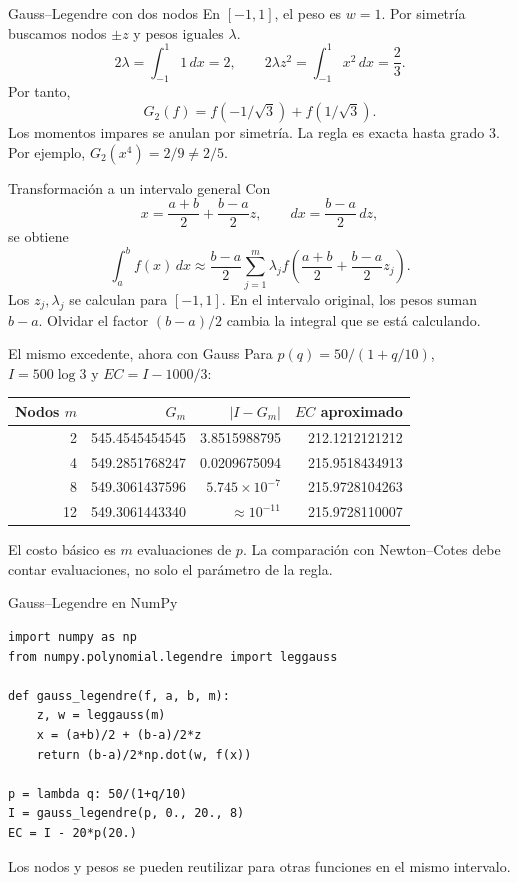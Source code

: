 \documentclass[aspectratio=169,12pt]{beamer}
\begin{document}
\begin{frame}{Gauss--Legendre con dos nodos}
En $[-1,1]$, el peso es $w=1$. Por simetría buscamos nodos $\pm z$
y pesos iguales $\lambda$.
\[2\lambda=\int_{-1}^1 1\,dx=2,\qquad
2\lambda z^2=\int_{-1}^1x^2\,dx=\frac23.\]
Por tanto,
\[\boxed{G_2(f)=f(-1/\sqrt3)+f(1/\sqrt3).}\]
Los momentos impares se anulan por simetría. La regla es exacta hasta grado $3$.
Por ejemplo, $G_2(x^4)=2/9\ne2/5$.
\end{frame}

\begin{frame}{Transformación a un intervalo general}
Con
\[x=\frac{a+b}{2}+\frac{b-a}{2}z,\qquad dx=\frac{b-a}{2}\,dz,\]
se obtiene
\[\int_a^b f(x)\,dx\approx\frac{b-a}{2}
\sum_{j=1}^m\lambda_j f\left(\frac{a+b}{2}+\frac{b-a}{2}z_j\right).\]
Los $z_j,\lambda_j$ se calculan para $[-1,1]$.
En el intervalo original, los pesos suman $b-a$.
Olvidar el factor $(b-a)/2$ cambia la integral que se está calculando.
\end{frame}

\begin{frame}{El mismo excedente, ahora con Gauss}
Para $p(q)=50/(1+q/10)$, $I=500\log3$ y $EC=I-1000/3$:
\begin{center}\begin{tabular}{rrrr}\toprule
Nodos $m$&$G_m$&$|I-G_m|$&$EC$ aproximado\\\midrule
2&545.4545454545&3.8515988795&212.1212121212\\
4&549.2851768247&0.0209675094&215.9518434913\\
8&549.3061437596&$5.745\times10^{-7}$&215.9728104263\\
12&549.3061443340&$\approx10^{-11}$&215.9728110007\\\bottomrule
\end{tabular}\end{center}
El costo básico es $m$ evaluaciones de $p$.
La comparación con Newton--Cotes debe contar evaluaciones, no solo el parámetro de la regla.
\end{frame}

\begin{frame}[fragile]{Gauss--Legendre en NumPy}
\begin{lstlisting}
import numpy as np
from numpy.polynomial.legendre import leggauss

def gauss_legendre(f, a, b, m):
    z, w = leggauss(m)
    x = (a+b)/2 + (b-a)/2*z
    return (b-a)/2*np.dot(w, f(x))

p = lambda q: 50/(1+q/10)
I = gauss_legendre(p, 0., 20., 8)
EC = I - 20*p(20.)
\end{lstlisting}
Los nodos y pesos se pueden reutilizar para otras funciones en el mismo intervalo.
\end{frame}
\end{document}
